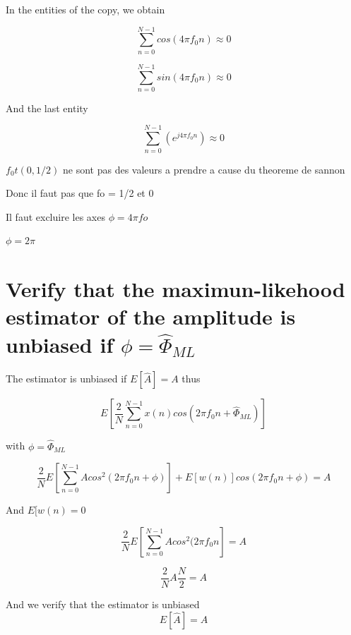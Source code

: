 \documentclass{report}
\begin{document}
In the entities of the copy, we obtain 

\begin{equation}\label{key}
\sum_{n=0}^{N-1}cos(4\pi f_0 n) \approx 0
\end{equation}

\begin{equation}\label{key}
\sum_{n=0}^{N-1}sin(4\pi f_0 n) \approx 0
\end{equation}

And the last entity 

\begin{equation}\label{key}
\sum_{n=0}^{N-1}(e^{j4\pi f_0n}) \approx 0
\end{equation}


$ f_0t(0,1/2) $ ne sont pas des valeurs a prendre a cause du theoreme de sannon

Donc il faut pas que fo = 1/2 et 0

Il faut excluire les axes
$ \phi = 4\pi fo  $

$ \phi = 2\pi $



\section{Verify that the maximun-likehood estimator of the amplitude is 
	unbiased if $ \phi =  \hat{\Phi}_{ML} $}

The estimator is unbiased if $ E[\hat{A}] = A $ thus

\begin{equation}
E[\frac{2}{N}\sum_{n=0}^{N-1}x(n)cos(2\pi f_0 n + \hat{\Phi}_{ML})]
\end{equation}

with $ \phi =  \hat{\Phi}_{ML} $

\begin{equation}
\frac{2}{N}E[\sum_{n=0}^{N-1}Acos^2(2\pi f_0 n + \phi)]+E[w(n)]cos(2\pi f_0 n + 
\phi) = A
\end{equation}

And $ E[w(n)=0 $


\begin{equation}
\frac{2}{N}E[\sum_{n=0}^{N-1}Acos^2(2\pi f_0 n] = A
\end{equation}

\begin{equation}
\frac{2}{N} A \frac{N}{2} = A
\end{equation}

And we verify that the estimator is unbiased
\begin{equation}
E[\hat{A}] = A
\end{equation}
\end{document}
